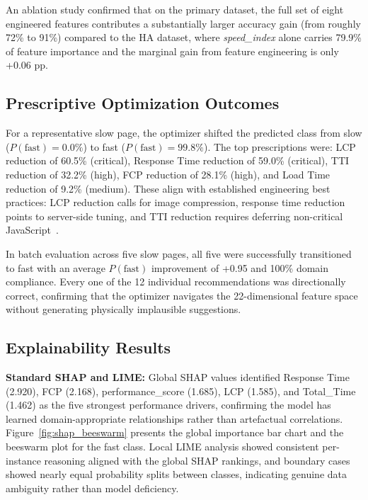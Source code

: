 \documentclass{svproc}
\begin{document}
An ablation study confirmed that on the primary dataset, the full set of eight engineered features contributes a substantially larger accuracy gain (from roughly 72\% to 91\%) compared to the HA dataset, where \textit{speed\_index} alone carries 79.9\% of feature importance and the marginal gain from feature engineering is only +0.06 pp.

\subsection{Prescriptive Optimization Outcomes}

For a representative slow page, the optimizer shifted the predicted class from slow ($P(\text{fast}) = 0.0\%$) to fast ($P(\text{fast}) = 99.8\%$). The top prescriptions were: LCP reduction of 60.5\% (critical), Response Time reduction of 59.0\% (critical), TTI reduction of 32.2\% (high), FCP reduction of 28.1\% (high), and Load Time reduction of 9.2\% (medium). These align with established engineering best practices: LCP reduction calls for image compression, response time reduction points to server-side tuning, and TTI reduction requires deferring non-critical JavaScript~\cite{vanriet2023,surianarayanan2023}.

In batch evaluation across five slow pages, all five were successfully transitioned to fast with an average $P(\text{fast})$ improvement of +0.95 and 100\% domain compliance. Every one of the 12 individual recommendations was directionally correct, confirming that the optimizer navigates the 22-dimensional feature space without generating physically implausible suggestions.

\subsection{Explainability Results}

\textbf{Standard SHAP and LIME:} Global SHAP values identified Response Time (2.920), FCP (2.168), performance\_score (1.685), LCP (1.585), and Total\_Time (1.462) as the five strongest performance drivers, confirming the model has learned domain-appropriate relationships rather than artefactual correlations. Figure~\ref{fig:shap_beeswarm} presents the global importance bar chart and the beeswarm plot for the fast class. Local LIME analysis showed consistent per-instance reasoning aligned with the global SHAP rankings, and boundary cases showed nearly equal probability splits between classes, indicating genuine data ambiguity rather than model deficiency.
\end{document}
